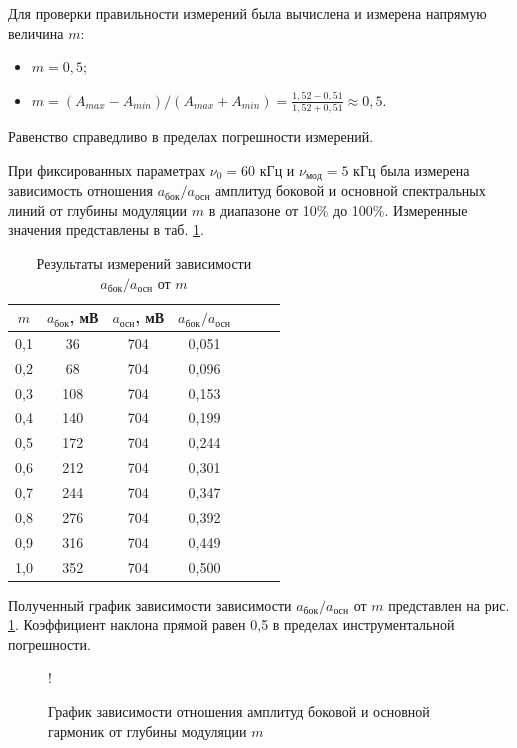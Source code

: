 \documentclass[a4paper,12pt]{article} %
\begin{document}
Для проверки правильности измерений была вычислена и измерена напрямую величина $m$:

\begin{itemize}
    \item $m = 0,5$;
    \item $m = (A_{max} - A_{min})/(A_{max} + A_{min}) = \frac{1,52 - 0,51}{1,52 + 0,51} \approx 0,5$.
\end{itemize}

Равенство справедливо в пределах погрешности измерений.

При фиксированных параметрах $\nu_0 = 60$ кГц и $\nu_{мод} = 5$ кГц была измерена зависимость отношения $a_\text{бок}/a_\text{осн}$ амплитуд боковой и основной спектральных линий от глубины модуляции $m$  в диапазоне от 10\% до 100\%. Измеренные значения представлены в таб. \ref{tab:resultsIII}.

\begin{table}[h!]
\begin{center}
\begin{tabular}{|c|c|c|c|c|c|c|}
\hline
$m$ & $a_\text{бок}$, мВ & $a_\text{осн}$, мВ & $a_\text{бок}/a_\text{осн}$ \\ \hline
0,1 & 36 & 704 & 0,051 \\ \hline
0,2 & 68 & 704 & 0,096 \\ \hline
0,3 & 108 & 704 & 0,153 \\ \hline
0,4 & 140 & 704 & 0,199 \\ \hline
0,5 & 172 & 704 & 0,244 \\ \hline
0,6 & 212 & 704 & 0,301 \\ \hline
0,7 & 244 & 704 & 0,347 \\ \hline
0,8 & 276 & 704 & 0,392 \\ \hline
0,9 & 316 & 704 & 0,449 \\ \hline
1,0 & 352 & 704 & 0,500 \\ \hline
\end{tabular}
\end{center}
\caption{Результаты измерений зависимости $a_\text{бок}/a_\text{осн}$ от $m$}
\label{tab:resultsIII}
\end{table}

Полученный график зависимости зависимости $a_\text{бок}/a_\text{осн}$ от $m$ представлен на рис. \ref{plotIII}. Коэффициент наклона прямой равен 0,5 в пределах инструментальной погрешности.

\begin{figure}[h!]
\centering
{} {!} {
}
\caption{График зависимости отношения амплитуд боковой и основной гармоник от глубины модуляции $m$}
\label{plotIII}
\end{figure}
\end{document}
